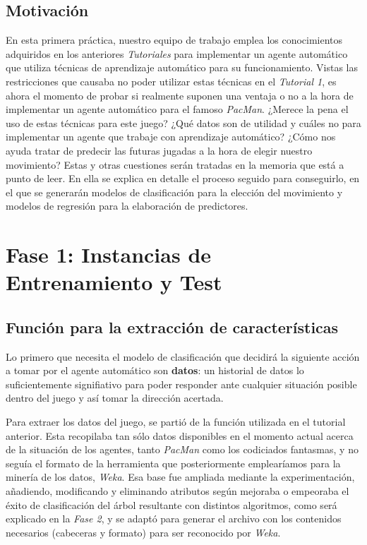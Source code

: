 \documentclass[12pt]{article}
\begin{document}
\newpage
\thispagestyle{empty}
\clearpage
\vspace*{\fill}
\begin{center}
    \begin{minipage}{\textwidth}
        \begin{center}
            \section*{Motivación}
            En esta primera práctica, nuestro equipo de trabajo emplea los conocimientos adquiridos en los anteriores \emph{Tutoriales} para implementar un agente automático que utiliza técnicas de aprendizaje automático para su funcionamiento. Vistas las restricciones que causaba no poder utilizar estas técnicas en el \emph{Tutorial 1}, es ahora el momento de probar si realmente suponen una ventaja o no a la hora de implementar un agente automático para el famoso \emph{PacMan}. ¿Merece la pena el uso de estas técnicas para este juego? ¿Qué datos son de utilidad y cuáles no para implementar un agente que trabaje con aprendizaje automático? ¿Cómo nos ayuda tratar de predecir las futuras jugadas a la hora de elegir nuestro movimiento? Estas y otras cuestiones serán tratadas en la memoria que está a punto de leer. En ella se explica en detalle el proceso seguido para conseguirlo, en el que se generarán modelos de clasificación para la elección del movimiento y modelos de regresión para la elaboración de predictores.
        \end{center}
    \end{minipage}
\end{center}
\vfill

\newpage
\section{Fase 1: Instancias de Entrenamiento y Test}

\subsection{Función para la extracción de características}

Lo primero que necesita el modelo de clasificación que decidirá la siguiente acción a tomar por el agente automático son \textbf{datos}: un historial de datos lo suficientemente signifiativo para poder responder ante cualquier situación posible dentro del juego y así tomar la dirección acertada.

Para extraer los datos del juego, se partió de la función utilizada en el tutorial anterior. Esta recopilaba tan sólo datos disponibles en el momento actual acerca de la situación de los agentes, tanto \emph{PacMan} como los codiciados fantasmas, y no seguía el formato de la herramienta que posteriormente emplearíamos para la minería de los datos, \emph{Weka}. Esa base fue ampliada mediante la experimentación, añadiendo, modificando y eliminando atributos según mejoraba o empeoraba el éxito de clasificación del árbol resultante con distintos algoritmos, como será explicado en la \emph{Fase 2}, y se adaptó para generar el archivo con los contenidos necesarios (cabeceras y formato) para ser reconocido por \emph{Weka}.
\end{document}

